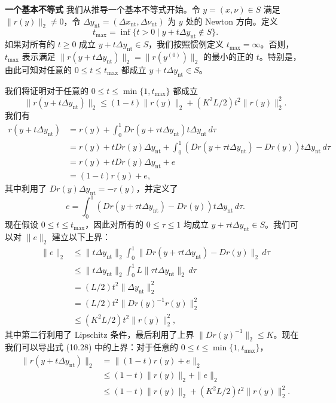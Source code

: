 \documentclass[UTF8,12pt,a4paper,fontset=fandol]{ctexart}
\begin{document}
\noindent\textbf{一个基本不等式}\quad
我们从推导一个基本不等式开始。令 $y=(x,\nu)\in S$ 满足 $\|r(y)\|_2\neq 0$，令 $\Delta y_{\mathrm{nt}}=(\Delta x_{\mathrm{nt}},\Delta\nu_{\mathrm{nt}})$ 为 $y$ 处的 Newton 方向。定义
\[
t_{\max}=\inf\{t>0\mid y+t\Delta y_{\mathrm{nt}}\notin S\}.
\]
如果对所有的 $t\geq 0$ 成立 $y+t\Delta y_{\mathrm{nt}}\in S$，我们按照惯例定义 $t_{\max}=\infty$。否则，$t_{\max}$ 表示满足 $\|r(y+t\Delta y_{\mathrm{nt}})\|_2=\|r(y^{(0)})\|_2$ 的最小的正的 $t$。特别是，由此可知对任意的 $0\leq t\leq t_{\max}$ 都成立 $y+t\Delta y_{\mathrm{nt}}\in S$。

我们将证明对于任意的 $0\leq t\leq \min\{1,t_{\max}\}$ 都成立
\begin{equation}
\|r(y+t\Delta y_{\mathrm{nt}})\|_2
\leq (1-t)\|r(y)\|_2+(K^2L/2)t^2\|r(y)\|_2^2.
\tag{10.28}
\end{equation}
我们有
\[
\begin{aligned}
r(y+t\Delta y_{\mathrm{nt}})
&=r(y)+\int_0^1 Dr(y+\tau t\Delta y_{\mathrm{nt}})t\Delta y_{\mathrm{nt}}\,d\tau\\
&=r(y)+tDr(y)\Delta y_{\mathrm{nt}}
  +\int_0^1(Dr(y+\tau t\Delta y_{\mathrm{nt}})-Dr(y))t\Delta y_{\mathrm{nt}}\,d\tau\\
&=r(y)+tDr(y)\Delta y_{\mathrm{nt}}+e\\
&=(1-t)r(y)+e,
\end{aligned}
\]
其中利用了 $Dr(y)\Delta y_{\mathrm{nt}}=-r(y)$，并定义了
\[
e=\int_0^1(Dr(y+\tau t\Delta y_{\mathrm{nt}})-Dr(y))t\Delta y_{\mathrm{nt}}\,d\tau.
\]
现在假设 $0\leq t\leq t_{\max}$，因此对所有的 $0\leq\tau\leq 1$ 均成立 $y+\tau t\Delta y_{\mathrm{nt}}\in S$。我们可以对 $\|e\|_2$ 建立以下上界：
\[
\begin{aligned}
\|e\|_2
&\leq \|t\Delta y_{\mathrm{nt}}\|_2
\int_0^1\|Dr(y+\tau t\Delta y_{\mathrm{nt}})-Dr(y)\|_2\,d\tau\\
&\leq \|t\Delta y_{\mathrm{nt}}\|_2
\int_0^1 L\|\tau t\Delta y_{\mathrm{nt}}\|_2\,d\tau\\
&=(L/2)t^2\|\Delta y_{\mathrm{nt}}\|_2^2\\
&=(L/2)t^2\|Dr(y)^{-1}r(y)\|_2^2\\
&\leq (K^2L/2)t^2\|r(y)\|_2^2,
\end{aligned}
\]
其中第二行利用了 Lipschitz 条件，最后利用了上界 $\|Dr(y)^{-1}\|_2\leq K$。现在我们可以导出式 (10.28) 中的上界：对于任意的 $0\leq t\leq \min\{1,t_{\max}\}$，
\[
\begin{aligned}
\|r(y+t\Delta y_{\mathrm{nt}})\|_2
&=\|(1-t)r(y)+e\|_2\\
&\leq (1-t)\|r(y)\|_2+\|e\|_2\\
&\leq (1-t)\|r(y)\|_2+(K^2L/2)t^2\|r(y)\|_2^2.
\end{aligned}
\]
\end{document}
